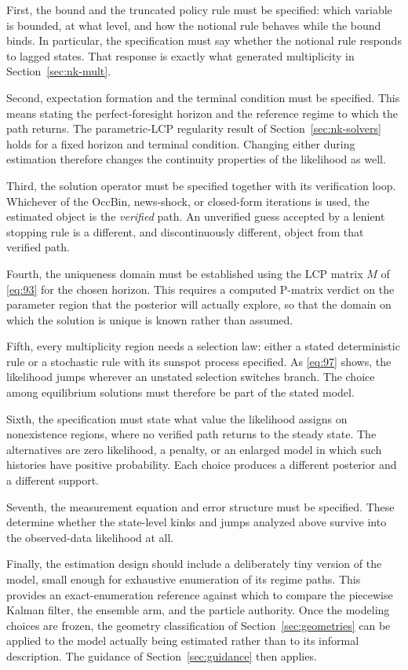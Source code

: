 \documentclass[11pt]{article}
\begin{document}
First, the bound and the truncated policy rule must be specified: which variable is bounded, at what level, and how the notional rule behaves while the bound binds. In particular, the specification must say whether the notional rule responds to lagged states. That response is exactly what generated multiplicity in Section~\ref{sec:nk-mult}.

Second, expectation formation and the terminal condition must be specified. This means stating the perfect-foresight horizon and the reference regime to which the path returns. The parametric-LCP regularity result of Section~\ref{sec:nk-solvers} holds for a fixed horizon and terminal condition. Changing either during estimation therefore changes the continuity properties of the likelihood as well.

Third, the solution operator must be specified together with its verification loop. Whichever of the OccBin, news-shock, or closed-form iterations is used, the estimated object is the \emph{verified} path. An unverified guess accepted by a lenient stopping rule is a different, and discontinuously different, object from that verified path.

Fourth, the uniqueness domain must be established using the LCP matrix $M$ of \eqref{eq:93} for the chosen horizon. This requires a computed P-matrix verdict on the parameter region that the posterior will actually explore, so that the domain on which the solution is unique is known rather than assumed.

Fifth, every multiplicity region needs a selection law: either a stated deterministic rule or a stochastic rule with its sunspot process specified. As \eqref{eq:97} shows, the likelihood jumps wherever an unstated selection switches branch. The choice among equilibrium solutions must therefore be part of the stated model.

Sixth, the specification must state what value the likelihood assigns on nonexistence regions, where no verified path returns to the steady state. The alternatives are zero likelihood, a penalty, or an enlarged model in which such histories have positive probability. Each choice produces a different posterior and a different support.

Seventh, the measurement equation and error structure must be specified. These determine whether the state-level kinks and jumps analyzed above survive into the observed-data likelihood at all.

Finally, the estimation design should include a deliberately tiny version of the model, small enough for exhaustive enumeration of its regime paths. This provides an exact-enumeration reference against which to compare the piecewise Kalman filter, the ensemble arm, and the particle authority. Once the modeling choices are frozen, the geometry classification of Section~\ref{sec:geometries} can be applied to the model actually being estimated rather than to its informal description. The guidance of Section~\ref{sec:guidance} then applies.
\end{document}
